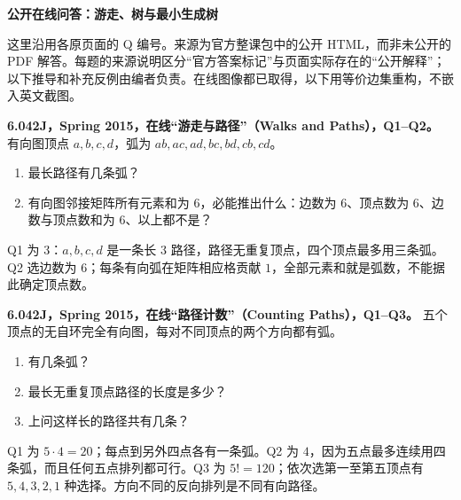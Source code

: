 \par\addvspace{7pt}\noindent\textbf{公开在线问答：游走、树与最小生成树}\par
这里沿用各原页面的 Q 编号。来源为官方整课包中的公开 HTML，而非未公开的 PDF 解答。每题的来源说明区分“官方答案标记”与页面实际存在的“公开解释”；以下推导和补充反例由编者负责。在线图像都已取得，以下用等价边集重构，不嵌入英文截图。

\begin{exercise}
\textbf{6.042J，Spring 2015，在线“游走与路径”（Walks and Paths），Q1--Q2。}
有向图顶点 $a,b,c,d$，弧为 $ab,ac,ad,bc,bd,cb,cd$。
\begin{enumerate}[label=Q\arabic*.]
\item\label{mit:6042-online-walks-and-paths-q1} 最长路径有几条弧？
\item\label{mit:6042-online-walks-and-paths-q2} 有向图邻接矩阵所有元素和为 $6$，必能推出什么：边数为 $6$、顶点数为 $6$、边数与顶点数和为 $6$、以上都不是？
\end{enumerate}
\end{exercise}
\begin{solution}
Q1 为 $3$：$a,b,c,d$ 是一条长 $3$ 路径，路径无重复顶点，四个顶点最多用三条弧。Q2 选边数为 $6$；每条有向弧在矩阵相应格贡献 $1$，全部元素和就是弧数，不能据此确定顶点数。
\end{solution}

\begin{exercise}
\textbf{6.042J，Spring 2015，在线“路径计数”（Counting Paths），Q1--Q3。}
五个顶点的无自环完全有向图，每对不同顶点的两个方向都有弧。
\begin{enumerate}[label=Q\arabic*.]
\item\label{mit:6042-online-counting-paths-q1} 有几条弧？
\item\label{mit:6042-online-counting-paths-q2} 最长无重复顶点路径的长度是多少？
\item\label{mit:6042-online-counting-paths-q3} 上问这样长的路径共有几条？
\end{enumerate}
\end{exercise}
\begin{solution}
Q1 为 $5\cdot4=20$；每点到另外四点各有一条弧。Q2 为 $4$，因为五点最多连续用四条弧，而且任何五点排列都可行。Q3 为 $5!=120$；依次选第一至第五顶点有 $5,4,3,2,1$ 种选择。方向不同的反向排列是不同有向路径。
\end{solution}

